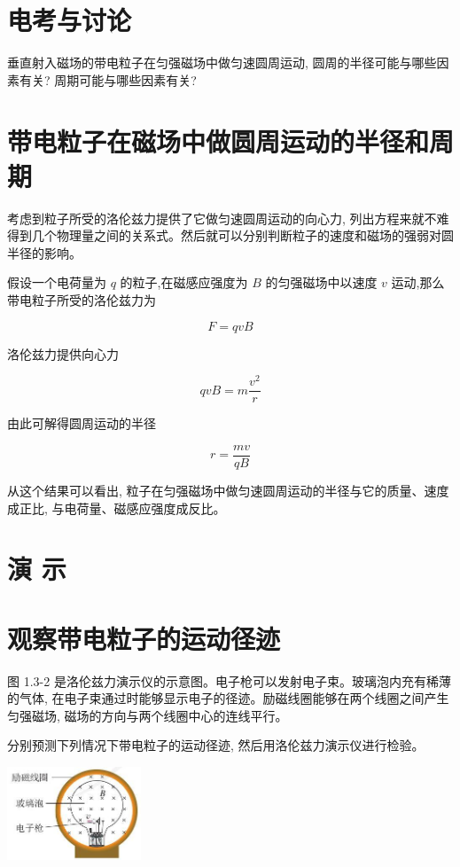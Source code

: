 \documentclass[10pt]{article}
\begin{document}
\section*{电考与讨论}

垂直射入磁场的带电粒子在匀强磁场中做匀速圆周运动, 圆周的半径可能与哪些因素有关? 周期可能与哪些因素有关?

\section*{带电粒子在磁场中做圆周运动的半径和周期}

考虑到粒子所受的洛伦兹力提供了它做匀速圆周运动的向心力, 列出方程来就不难得到几个物理量之间的关系式。然后就可以分别判断粒子的速度和磁场的强弱对圆半径的影响。

假设一个电荷量为 \(q\) 的粒子,在磁感应强度为 \(B\) 的匀强磁场中以速度 \(v\) 运动,那么带电粒子所受的洛伦兹力为

\[
F = {qvB}
\]

洛伦兹力提供向心力

\[
{qvB} = m\frac{{v}^{2}}{r}
\]

由此可解得圆周运动的半径

\[
r = \frac{mv}{qB}
\]

从这个结果可以看出, 粒子在匀强磁场中做匀速圆周运动的半径与它的质量、速度成正比, 与电荷量、磁感应强度成反比。

\section*{演 示}

\section*{观察带电粒子的运动径迹}

图 1.3-2 是洛伦兹力演示仪的示意图。电子枪可以发射电子束。玻璃泡内充有稀薄的气体, 在电子束通过时能够显示电子的径迹。励磁线圈能够在两个线圈之间产生匀强磁场, 磁场的方向与两个线圈中心的连线平行。

分别预测下列情况下带电粒子的运动径迹, 然后用洛伦兹力演示仪进行检验。

\begin{center}
\includegraphics[max width=0.3\textwidth]{images/01910e72-c5b7-7ed5-a6d4-fb3a5faefc32_19_635305.jpg}
\end{center}
\end{document}
